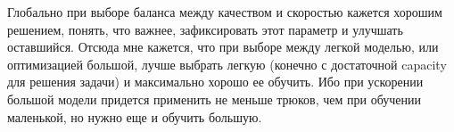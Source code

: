 \documentclass[11pt,a4paper]{article}
\theoremstyle{remark}
\begin{document}
	 Глобально при выборе баланса между качеством и скоростью кажется хорошим решением, понять, что важнее, зафиксировать этот параметр и улучшать оставшийся. Отсюда мне кажется, что при выборе между легкой моделью, или оптимизацией большой, лучше выбрать легкую (конечно с достаточной capacity для решения задачи) и максимально хорошо ее обучить. Ибо при ускорении большой модели придется применить не меньше трюков, чем при обучении маленькой, но нужно еще и обучить большую.
	
	
	
%	
%		
%		
%		
%		
%		
%		
			
		
\end{document}
